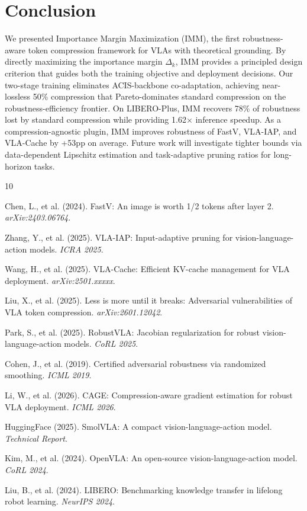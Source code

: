 \documentclass[conference]{corl_2026}
\newcommand{\ours}{IMM}
\newcommand{\deltak}{\Delta_k}
\begin{document}
\section{Conclusion}
\label{sec:conclusion}

We presented Importance Margin Maximization (\ours{}), the first robustness-aware token compression framework for VLAs with theoretical grounding. By directly maximizing the importance margin $\deltak$, \ours{} provides a principled design criterion that guides both the training objective and deployment decisions.
Our two-stage training eliminates ACIS-backbone co-adaptation, achieving near-lossless 50\% compression that Pareto-dominates standard compression on the robustness-efficiency frontier.
On LIBERO-Plus, \ours{} recovers 78\% of robustness lost by standard compression while providing 1.62$\times$ inference speedup.
As a compression-agnostic plugin, \ours{} improves robustness of FastV, VLA-IAP, and VLA-Cache by +53pp on average.
Future work will investigate tighter bounds via data-dependent Lipschitz estimation and task-adaptive pruning ratios for long-horizon tasks.


\begin{thebibliography}{10}

Chen, L., et al. (2024). FastV: An image is worth 1/2 tokens after layer 2. \emph{arXiv:2403.06764}.

Zhang, Y., et al. (2025). VLA-IAP: Input-adaptive pruning for vision-language-action models. \emph{ICRA 2025}.

Wang, H., et al. (2025). VLA-Cache: Efficient KV-cache management for VLA deployment. \emph{arXiv:2501.xxxxx}.

Liu, X., et al. (2025). Less is more until it breaks: Adversarial vulnerabilities of VLA token compression. \emph{arXiv:2601.12042}.

Park, S., et al. (2025). RobustVLA: Jacobian regularization for robust vision-language-action models. \emph{CoRL 2025}.

Cohen, J., et al. (2019). Certified adversarial robustness via randomized smoothing. \emph{ICML 2019}.

Li, W., et al. (2026). CAGE: Compression-aware gradient estimation for robust VLA deployment. \emph{ICML 2026}.

HuggingFace (2025). SmolVLA: A compact vision-language-action model. \emph{Technical Report}.

Kim, M., et al. (2024). OpenVLA: An open-source vision-language-action model. \emph{CoRL 2024}.

Liu, B., et al. (2024). LIBERO: Benchmarking knowledge transfer in lifelong robot learning. \emph{NeurIPS 2024}.

\end{thebibliography}
\end{document}
